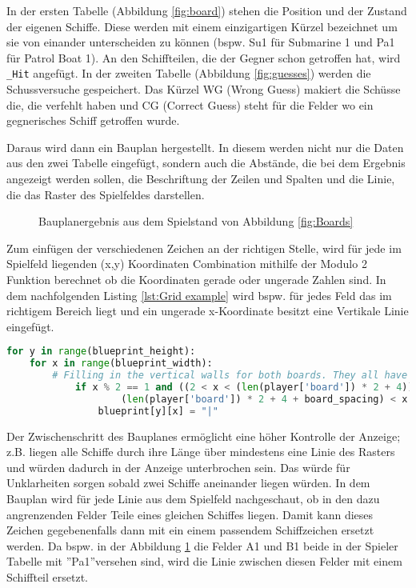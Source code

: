 \documentclass{article}
\begin{document}
\par
    In der ersten Tabelle (Abbildung \ref{fig:board}) stehen die Position und der Zustand der eigenen Schiffe. Diese werden mit einem einzigartigen Kürzel bezeichnet um sie von einander unterscheiden zu können (bspw. Su1 für Submarine 1 und Pa1 für Patrol Boat 1). An den Schiffteilen, die der Gegner schon getroffen hat, wird \verb$_Hit$ angefügt. In der zweiten Tabelle (Abbildung \ref{fig:guesses}) werden die Schussversuche gespeichert. Das Kürzel WG (Wrong Guess) makiert die Schüsse die, die verfehlt haben und CG (Correct Guess) steht für die Felder wo ein gegnerisches Schiff getroffen wurde.\newline

\par
    Daraus wird dann ein Bauplan hergestellt. In diesem werden nicht nur die Daten aus den zwei Tabelle eingefügt, sondern auch die Abstände, die bei dem Ergebnis angezeigt werden sollen, die Beschriftung der Zeilen und Spalten und die Linie, die das Raster des Spielfeldes darstellen.

\begin{figure}[H]
    \centering
    
    \caption{Bauplanergebnis aus dem Spielstand von Abbildung \ref{fig:Boards}}
    \label{fig:blueprint}
\end{figure}

\par
    Zum einfügen der verschiedenen Zeichen an der richtigen Stelle, wird für jede im Spielfeld liegenden (x,y) Koordinaten Combination mithilfe der Modulo 2 Funktion berechnet ob die Koordinaten gerade oder ungerade Zahlen sind. In dem nachfolgenden Listing \ref{lst:Grid example} wird bspw. für jedes Feld das im richtigem Bereich liegt und ein ungerade x-Koordinate besitzt eine Vertikale Linie eingefügt.

\begin{lstlisting}[language=Python, caption =Beispiel zum Einfügen von bestimmten Teilen des Spielfeldrasters, label=lst:Grid example]
for y in range(blueprint_height):
    for x in range(blueprint_width):
        # Filling in the vertical walls for both boards. They all have odd x coordinate
            if x % 2 == 1 and ((2 < x < (len(player['board']) * 2 + 4)) or (
                    (len(player['board']) * 2 + 4 + board_spacing) < x < blueprint_width)):
                blueprint[y][x] = "|"
\end{lstlisting}

\par
    Der Zwischenschritt des Bauplanes ermöglicht eine höher Kontrolle der Anzeige; z.B. liegen alle Schiffe durch ihre Länge über mindestens eine Linie des Rasters und würden dadurch in der Anzeige unterbrochen sein. Das würde für Unklarheiten sorgen sobald zwei Schiffe aneinander liegen würden. In dem Bauplan wird für jede Linie aus dem Spielfeld nachgeschaut, ob in den dazu angrenzenden Felder Teile eines gleichen Schiffes liegen. Damit kann dieses Zeichen gegebenenfalls dann mit ein einem passendem Schiffzeichen ersetzt werden. Da bspw. in der Abbildung \ref{fig:blueprint} die Felder A1 und B1 beide in der Spieler Tabelle mit ''Pa1''versehen sind, wird die Linie zwischen diesen Felder mit einem Schiffteil ersetzt.
\end{document}
